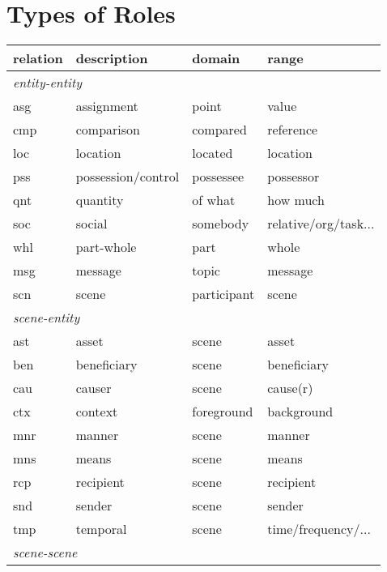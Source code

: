 \documentclass[a4paper]{article}
\begin{document}
\section{Types of Roles}

\begin{table}
    \begin{tabular}{llll}
        \toprule
        \textbf{relation} & \textbf{description} & \textbf{domain} & \textbf{range} \\
        \midrule
        \multicolumn{4}{l}{\emph{entity-entity}} \\
        asg & assignment & point & value \\
        cmp & comparison & compared & reference \\
        loc & location & located & location \\
        pss & possession/control & possessee & possessor \\
        qnt & quantity & of what & how much \\
        soc & social & somebody & relative/org/task... \\
        whl & part-whole & part & whole \\
        msg & message & topic & message \\
        scn & scene & participant & scene \\
        \midrule
        \multicolumn{4}{l}{\emph{scene-entity}} \\
        ast & asset & scene & asset \\
        ben & beneficiary & scene & beneficiary \\
        cau & causer & scene & cause(r) \\
        ctx & context & foreground & background \\
        mnr & manner & scene & manner \\
        mns & means & scene & means \\
        rcp & recipient & scene & recipient \\
        snd & sender & scene & sender \\
        tmp & temporal & scene & time/frequency/... \\
        \midrule
        \multicolumn{4}{l}{\emph{scene-scene}} \\

\end{tabular}
\end{table}
\end{document}
